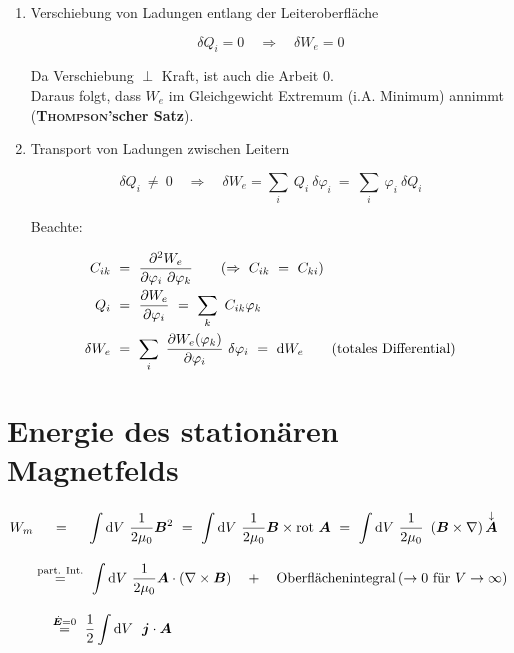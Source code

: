 \begin{enumerate}
	
	\item Verschiebung von Ladungen entlang der Leiteroberfläche
	
	\begin{equation*}
	\delta Q_i = 0 \quad \Rightarrow \quad \delta W_e = 0
	\end{equation*}
	
	Da Verschiebung $\perp$ Kraft, ist auch die Arbeit 0.\\
	Daraus folgt, dass $W_e$ im Gleichgewicht Extremum (i.A. Minimum) annimmt (\textbf{\textsc{Thompson}'scher Satz}).
	
	\item Transport von Ladungen zwischen Leitern
	
	\begin{equation*}
	\delta Q_i \ \neq \ 0 \quad\Rightarrow\quad \delta W_e = \sum_i \ Q_i \ \delta\varphi_i \ = \ \sum_i \ \varphi_i \ \delta Q_i
	\end{equation*} 
	
	Beachte:
	
	\begin{align*}
	C_{ik} \ &= \ \frac{\partial^2 W_e}{\partial \varphi_i \ \partial\varphi_k} \qquad(\Rightarrow \ C_{ik} \ = \ C_{ki})\\
	Q_i \ &= \ \pdiff{W_e}{\varphi_i} \ = \ \sum_k \ C_{ik} \varphi_k\\
	\delta W_e \ &= \ \sum_i \ \pdiff{W_e(\varphi_k)}{\varphi_i} \ \delta\varphi_i \ = \ \d W_e \qquad (\text{totales Differential})
	\end{align*}
\end{enumerate}

\section{Energie des stationären Magnetfelds}

\begin{align*}
W_m & \ \quad = \quad  \ \Int{}{}{V}\frac{1}{2\mu_0}\vec{B}^2 \ =  \ \Int{}{}{V} \frac{1}{2\mu_0} \vec{B}\times\rot\vec{A} \ = \ \Int{}{}{V} \frac{1}{2\mu_0} \ \left(\vec{B}\times\nabla\right) \overset{\downarrow}{\vec{A}}\\
& \overset{\text{part. Int.}}{=}  \  \Int{}{}{V} \frac{1}{2\mu_0} \vec{A} \cdot\left(\nabla\times\vec{B}\right) \quad + \quad \text{Oberflächenintegral} \left(\rightarrow 0 \text{ für } V \rightarrow \infty\right)\\
& \;\;\;\;\overset{\dot{\vec{E}}=0}{=} \ \frac{1}{2} \Int{}{}{V} \ \vec{j}\cdot\vec{A}
\end{align*}

